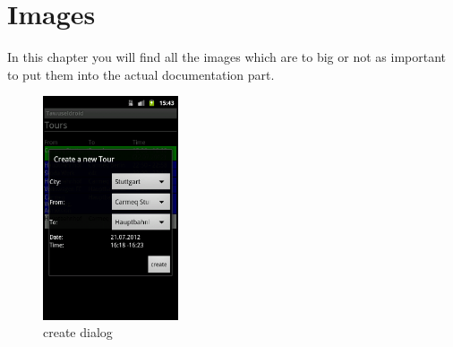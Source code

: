 \thispagestyle{fancy}

\chapter{Images}
In this chapter you will find all the images which are to big or not as important to put them into the actual documentation part.

\clearpage

\begin{figure}[ht]
	\centering
	\includegraphics[width=4cm]{images/Tawuseldroid_create}
	\caption{create dialog}
	\label{img:AndCD}
\end{figure}

